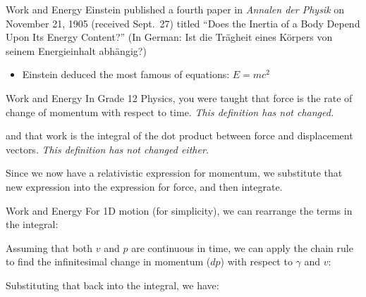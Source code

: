 \documentclass[12pt,compress,aspectratio=169]{beamer}
\begin{document}
\begin{frame}{Work and Energy}
  Einstein published a fourth paper in \emph{Annalen der Physik} on November
  21, 1905 (received Sept.\ 27) titled ``Does the Inertia of a Body Depend Upon
  Its Energy Content?'' (In German: Ist die Tr\"{a}gheit eines K\"{o}rpers von
  seinem Energieinhalt abh\"{a}ngig?)
  \begin{itemize}
  \item Einstein deduced the most famous of equations: $E=mc^2$
  \end{itemize}
\end{frame}


\begin{frame}{Work and Energy}
  In Grade 12 Physics, you were taught that force is the rate of change of
  momentum with respect to time. \emph{This definition has not changed.}


  \vspace{-.1in}and that work is the integral of the dot product between force
  and displacement vectors. \emph{This definition has not changed either.}


  \vspace{-.1in}Since we now have a relativistic expression for momentum, we
  substitute that new expression into the expression for force, and then
  integrate.
\end{frame}



\begin{frame}{Work and Energy}
  For 1D motion (for simplicity), we can rearrange the terms in the integral:

  
  \vspace{-.1in}Assuming that both $v$ and $p$ are continuous in time, we can
  apply the chain rule to find the infinitesimal change in momentum ($dp$) with
  respect to $\gamma$ and $v$:
  

  \vspace{-.1in}Substituting that back into the integral, we have:
  
\end{frame}
\end{document}
